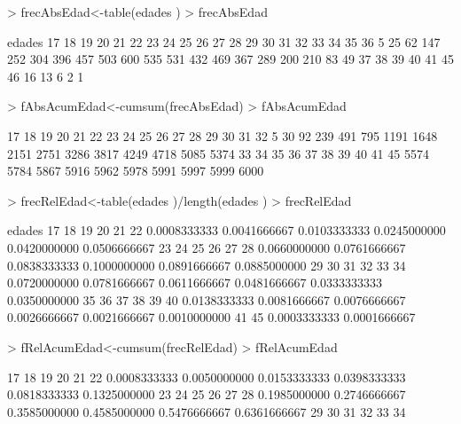 \documentclass [a4paper] {article}
\begin{document}
\begin{Schunk}
\begin{Sinput}
> frecAbsEdad<-table(edades )
> frecAbsEdad
\end{Sinput}
\begin{Soutput}
edades
 17  18  19  20  21  22  23  24  25  26  27  28  29  30  31  32  33  34  35  36 
  5  25  62 147 252 304 396 457 503 600 535 531 432 469 367 289 200 210  83  49 
 37  38  39  40  41  45 
 46  16  13   6   2   1 
\end{Soutput}
\begin{Sinput}
> fAbsAcumEdad<-cumsum(frecAbsEdad)
> fAbsAcumEdad
\end{Sinput}
\begin{Soutput}
  17   18   19   20   21   22   23   24   25   26   27   28   29   30   31   32 
   5   30   92  239  491  795 1191 1648 2151 2751 3286 3817 4249 4718 5085 5374 
  33   34   35   36   37   38   39   40   41   45 
5574 5784 5867 5916 5962 5978 5991 5997 5999 6000 
\end{Soutput}
\begin{Sinput}
> frecRelEdad<-table(edades )/length(edades )
> frecRelEdad
\end{Sinput}
\begin{Soutput}
edades
          17           18           19           20           21           22 
0.0008333333 0.0041666667 0.0103333333 0.0245000000 0.0420000000 0.0506666667 
          23           24           25           26           27           28 
0.0660000000 0.0761666667 0.0838333333 0.1000000000 0.0891666667 0.0885000000 
          29           30           31           32           33           34 
0.0720000000 0.0781666667 0.0611666667 0.0481666667 0.0333333333 0.0350000000 
          35           36           37           38           39           40 
0.0138333333 0.0081666667 0.0076666667 0.0026666667 0.0021666667 0.0010000000 
          41           45 
0.0003333333 0.0001666667 
\end{Soutput}
\begin{Sinput}
> fRelAcumEdad<-cumsum(frecRelEdad)
> fRelAcumEdad
\end{Sinput}
\begin{Soutput}
          17           18           19           20           21           22 
0.0008333333 0.0050000000 0.0153333333 0.0398333333 0.0818333333 0.1325000000 
          23           24           25           26           27           28 
0.1985000000 0.2746666667 0.3585000000 0.4585000000 0.5476666667 0.6361666667 
          29           30           31           32           33           34 

\end{Soutput}
\end{Schunk}
\end{document}
